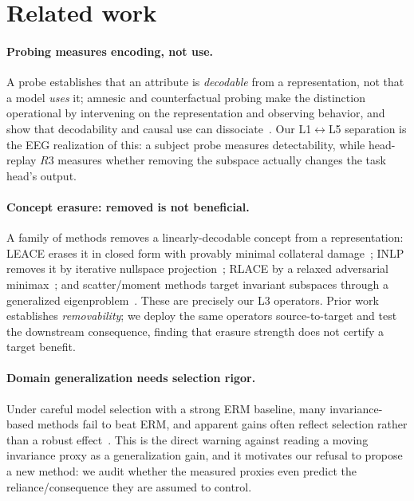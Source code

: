 \section{Related work}
\label{sec:related}

\paragraph{Probing measures encoding, not use.} A probe establishes that an attribute is
\emph{decodable} from a representation, not that a model \emph{uses} it; amnesic and counterfactual
probing make the distinction operational by intervening on the representation and observing behavior,
and show that decodability and causal use can dissociate~\citep{elazar2021amnesic}. Our
L1$\leftrightarrow$L5 separation is the EEG realization of this: a subject probe measures detectability,
while head-replay $R3$ measures whether removing the subspace actually changes the task head's output.

\paragraph{Concept erasure: removed is not beneficial.} A family of methods removes a linearly-decodable
concept from a representation: LEACE erases it in closed form with provably minimal collateral
damage~\citep{belrose2023leace}; INLP removes it by iterative nullspace projection~\citep{ravfogel2020inlp};
RLACE by a relaxed adversarial minimax~\citep{ravfogel2022rlace}; and scatter/moment methods target
invariant subspaces through a generalized eigenproblem~\citep{ghifary2017sca}. These are precisely our
L3 operators. Prior work establishes \emph{removability}; we deploy the same operators source-to-target
and test the downstream consequence, finding that erasure strength does not certify a target benefit.

\paragraph{Domain generalization needs selection rigor.} Under careful model selection with a strong
ERM baseline, many invariance-based methods fail to beat ERM, and apparent gains often reflect
selection rather than a robust effect~\citep{gulrajani2021domainbed}. This is the direct warning against
reading a moving invariance proxy as a generalization gain, and it motivates our refusal to propose a
new method: we audit whether the measured proxies even predict the reliance/consequence they are assumed
to control.

